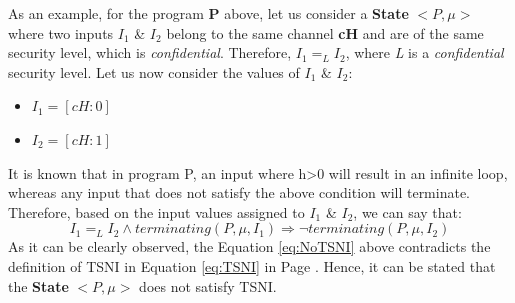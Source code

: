 \medskip
As an example, for the program \textbf{P} above, let us consider a \textbf{State} $<P, \mu>$ where two inputs $I_{1}$ \& $I_{2}$ belong to the same channel \textbf{cH} and are of the same security level, which is \textit{confidential}. Therefore, $I_{1} = _{L} I_{2}$, where \textit{L} is a \textit{confidential} security level. Let us now consider the values of $I_{1}$ \& $I_{2}$: \par
\begin{itemize}
	\item $I_{1} = [cH: 0]$
	\item $I_{2} = [cH: 1]$
\end{itemize}
It is known that in program P, an input where h>0 will result in an infinite loop, whereas any input that does not satisfy the above condition will terminate. Therefore, based on the input values assigned to $I_{1}$ \& $I_{2}$, we can say that:
\begin{equation} \label{eq:NoTSNI}
I_{1} = _{L} I_{2} \land terminating(P, \mu, I_{1}) \Longrightarrow \neg terminating(P, \mu, I_{2})
\end{equation}
As it can be clearly observed, the Equation \ref{eq:NoTSNI} above contradicts the definition of TSNI in Equation \ref{eq:TSNI} in Page \pageref{eq:TSNI}. Hence, it can be stated that the \textbf{State} $<P, \mu>$ does not satisfy TSNI.

